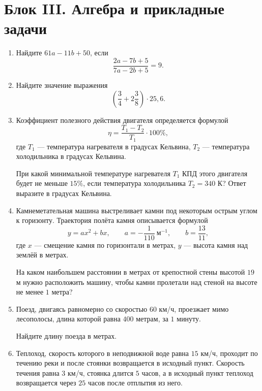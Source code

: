 \documentclass[a4paper,12pt]{article}
\newcommand{\taskspace}{\par\vspace{0.55cm}}
\begin{document}
\newpage


\section*{Блок III. Алгебра и прикладные задачи}

\begin{enumerate}[resume]

\item Найдите $61a-11b+50$, если
\[
\frac{2a-7b+5}{7a-2b+5}=9.
\]
\taskspace

\item Найдите значение выражения
\[
\left(\frac{3}{4}+2\frac{3}{8}\right)\cdot 25{,}6.
\]
\taskspace

\item Коэффициент полезного действия двигателя определяется формулой
\[
\eta=\frac{T_1-T_2}{T_1}\cdot 100\%,
\]
где $T_1$ --- температура нагревателя в градусах Кельвина,
$T_2$ --- температура холодильника в градусах Кельвина.

При какой минимальной температуре нагревателя $T_1$ КПД этого двигателя
будет не меньше $15\%$, если температура холодильника $T_2=340$ К?
Ответ выразите в градусах Кельвина.
\taskspace

\item Камнеметательная машина выстреливает камни под некоторым острым
углом к горизонту. Траектория полёта камня описывается формулой
\[
y=ax^2+bx,
\qquad
a=-\frac{1}{110}\ \text{м}^{-1},
\qquad
b=\frac{13}{11},
\]
где $x$ --- смещение камня по горизонтали в метрах, $y$ --- высота
камня над землёй в метрах.

На каком наибольшем расстоянии в метрах от крепостной стены высотой
$19$ м нужно расположить машину, чтобы камни пролетали над стеной
на высоте не менее $1$ метра?
\taskspace

\item Поезд, двигаясь равномерно со скоростью $60$ км/ч, проезжает
мимо лесополосы, длина которой равна $400$ метрам, за $1$ минуту.

Найдите длину поезда в метрах.
\taskspace

\newpage

\item Теплоход, скорость которого в неподвижной воде равна $15$ км/ч,
проходит по течению реки и после стоянки возвращается в исходный пункт.
Скорость течения равна $3$ км/ч, стоянка длится $5$ часов, а в исходный
пункт теплоход возвращается через $25$ часов после отплытия из него.


\end{enumerate}
\end{document}
